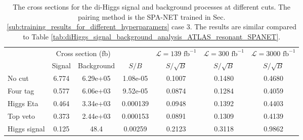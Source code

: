 \documentclass[12pt]{article}
\begin{document}
		\begin{table}[htpb]
			\centering
			\caption{The cross sections for the di-Higgs signal and background processes at different cuts. The pairing method is the SPA-NET trained in Sec.\ref{sub:training_results_for_different_hyperparamers} case 3. The results are similar compared to Table \ref{tab:diHiggs_signal_background_analysis_ATLAS_resonant_SPANET}.}
			\label{tab:diHiggs_signal_background_analysis_ATLAS_best_hp_SPANET_3}
			\begin{tabular}{l|cc|c|c|c|c}
							 & \multicolumn{2}{c|}{Cross section (fb)} &          & $\mathcal{L} = 139 \text{ fb}^{-1}$ & $\mathcal{L} = 300 \text{ fb}^{-1}$ & $\mathcal{L} = 3000 \text{ fb}^{-1}$ \\
							 & Signal           & Background           & $S / B$  & $S/\sqrt{B}$                        & $S/\sqrt{B}$                        & $S/\sqrt{B}$                         \\ \hline
				No cut       & 6.774 & 6.29e+05 & 1.08e-05 & 0.1007 & 0.1480 & 0.4680 \\
				Four tag     & 0.577 & 6.06e+03 & 9.52e-05 & 0.0874 & 0.1284 & 0.4059 \\
				Higgs Eta    & 0.464 & 3.34e+03 & 0.000139 & 0.0948 & 0.1392 & 0.4403 \\
				Top veto     & 0.373 & 2.44e+03 & 0.000153 & 0.0891 & 0.1309 & 0.4139 \\
				Higgs signal & 0.125 & 48.4     & 0.00259  & 0.2123 & 0.3118 & 0.9862
			\end{tabular}
		\end{table}
\end{document}
